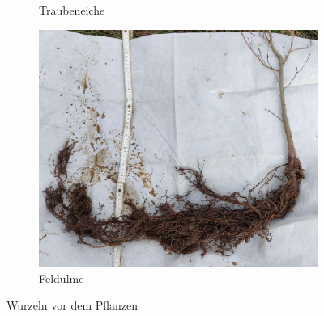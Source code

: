 \documentclass[twocolumn]{scrartcl}
\begin{document}
\begin{figure}[htbp]
\begin{subfigure}[t]{0.95\linewidth}
    \caption{Traubeneiche}
  \end{subfigure}
  \begin{subfigure}[t]{0.95\linewidth}
    \centering
    \includegraphics[width=\linewidth]{./bild/wurzelUlme}
    \caption{Feldulme}
  \end{subfigure}
  \caption{Wurzeln vor dem Pflanzen}
  \label{fig:wurzelAndere}
\end{figure}
\end{document}
